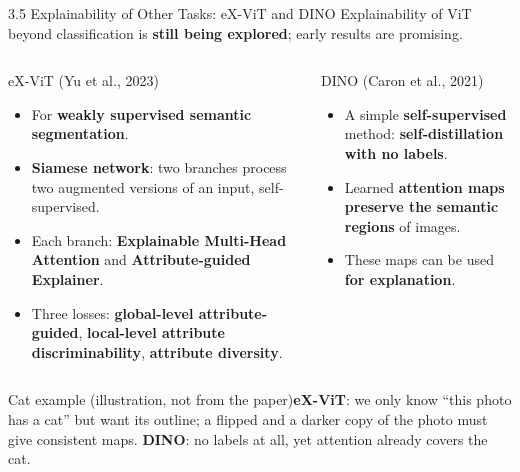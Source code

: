 \documentclass[10pt]{beamer}
\newcommand{\catex}[1]{\begin{exampleblock}{\footnotesize Cat example (illustration, not from the paper)}\footnotesize #1\end{exampleblock}}
\begin{document}
\begin{frame}{3.5 Explainability of Other Tasks: eX-ViT and DINO}
Explainability of ViT beyond classification is \textbf{still being explored}; early results are promising.
\vspace{0.3em}
\begin{columns}[T]
\begin{block}{eX-ViT (Yu et al., 2023)}
\scriptsize
\begin{itemize}
\item For \textbf{weakly supervised semantic segmentation}.
\item \textbf{Siamese network}: two branches process two augmented versions of an input, self-supervised.
\item Each branch: \textbf{Explainable Multi-Head Attention} and \textbf{Attribute-guided Explainer}.
\item Three losses: \textbf{global-level attribute-guided}, \textbf{local-level attribute discriminability}, \textbf{attribute diversity}.
\end{itemize}
\end{block}
\begin{block}{DINO (Caron et al., 2021)}
\scriptsize
\begin{itemize}
\item A simple \textbf{self-supervised} method: \textbf{self-distillation with no labels}.
\item Learned \textbf{attention maps preserve the semantic regions} of images.
\item These maps can be used \textbf{for explanation}.
\end{itemize}
\end{block}
\end{columns}
\catex{\textbf{eX-ViT}: we only know ``this photo has a cat'' but want its outline; a flipped and a darker copy of the photo must give consistent maps. \textbf{DINO}: no labels at all, yet attention already covers the cat.}
\end{frame}
\end{document}
